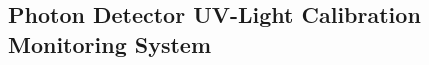 %
%







\subsection{Photon Detector UV-Light Calibration Monitoring System}
\label{sec_pd_calib}

